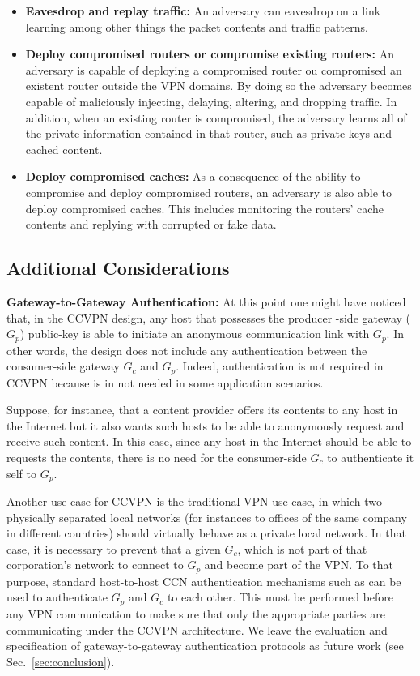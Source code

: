 \begin{itemize}
	\item \textbf{Eavesdrop and replay traffic:} An adversary can eavesdrop on a link learning among other things the packet contents and traffic patterns.
	\item \textbf{Deploy compromised routers or compromise existing routers:} An adversary is capable of deploying a compromised router ou compromised an existent router outside the VPN domains. By doing so the adversary becomes capable of maliciously injecting, delaying, altering, and dropping traffic. In addition, when an existing router is compromised, the adversary learns all of the private information contained in that router, such as private keys and cached content.
	\item \textbf{Deploy compromised caches:} As a consequence of the ability to compromise and deploy compromised routers, an adversary is also able to deploy compromised caches. This includes monitoring the routers' cache contents and replying with corrupted or fake data.
\end{itemize}

\subsection{Additional Considerations}

\textbf{Gateway-to-Gateway Authentication:} At this point one might have noticed that, in the CCVPN design, any host that possesses the producer -side gateway ($G_p$) public-key is able to initiate an anonymous communication link with $G_p$. In other words, the design does not include any authentication between the consumer-side gateway $G_c$ and $G_p$. Indeed, authentication is not required in CCVPN because is in not needed in some application scenarios.

Suppose, for instance, that a content provider offers its contents to any host in the Internet but it also  wants such hosts to be able to anonymously request and receive such content. In this case, since any host in the Internet should be able to requests the contents, there is no need for the consumer-side $G_c$ to authenticate it self to $G_p$.

Another use case for CCVPN is the traditional VPN use case, in which two physically separated local networks (for instances to offices of the same company in different countries) should virtually behave as a private local network. In that case, it is necessary to prevent that a given $G_c$, which is not part of that corporation's network to connect to $G_p$ and become part of the VPN. To that purpose, standard host-to-host CCN authentication mechanisms such as \cite{} can be used to authenticate $G_p$ and $G_c$ to each other. This must be performed before any VPN communication to make sure that only the appropriate parties are communicating under the CCVPN architecture. We leave the evaluation and specification of gateway-to-gateway authentication protocols as future work (see Sec.~\ref{sec:conclusion}).

